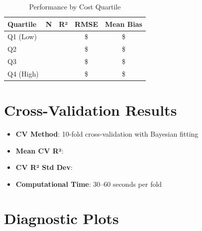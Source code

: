 \begin{table}[h]
\centering
\caption{Performance by Cost Quartile}
\begin{tabular}{lcccc}
\toprule
\textbf{Quartile} & \textbf{N} & \textbf{R²} & \textbf{RMSE} & \textbf{Mean Bias} \\
\midrule
Q1 (Low) & \ModelEightSubgroupcostQOneLowN{} & \ModelEightSubgroupcostQOneLowRSquared{} & \$\ModelEightSubgroupcostQOneLowRMSE{} & \$\ModelEightSubgroupcostQOneLowBias{} \\
Q2 & \ModelEightSubgroupcostQTwoN{} & \ModelEightSubgroupcostQTwoRSquared{} & \$\ModelEightSubgroupcostQTwoRMSE{} & \$\ModelEightSubgroupcostQTwoBias{} \\
Q3 & \ModelEightSubgroupcostQThreeN{} & \ModelEightSubgroupcostQThreeRSquared{} & \$\ModelEightSubgroupcostQThreeRMSE{} & \$\ModelEightSubgroupcostQThreeBias{} \\
Q4 (High) & \ModelEightSubgroupcostQFourHighN{} & \ModelEightSubgroupcostQFourHighRSquared{} & \$\ModelEightSubgroupcostQFourHighRMSE{} & \$\ModelEightSubgroupcostQFourHighBias{} \\
\bottomrule
\end{tabular}
\end{table}

\section{Cross-Validation Results}

\begin{itemize}
    \item \textbf{CV Method}: 10-fold cross-validation with Bayesian fitting
    \item \textbf{Mean CV R²}: \ModelEightCVMean{}
    \item \textbf{CV R² Std Dev}: \ModelEightCVStd{}
    \item \textbf{Computational Time}: 30--60 seconds per fold
\end{itemize}

\section{Diagnostic Plots}


